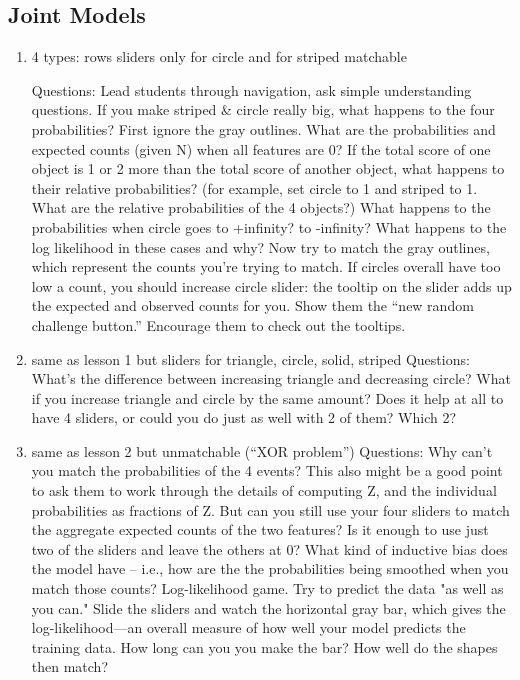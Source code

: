 \documentclass[11pt,letterpaper]{article}
\begin{document}
\subsection{Joint Models} \label{sec:jointlessons}
\begin{enumerate}
\item 
4 types: rows %
sliders only for circle and for striped
matchable

Questions: Lead students through navigation, ask simple understanding questions. If you make striped \& circle really big, what happens to the four probabilities?  First ignore the gray outlines.  What are the probabilities and expected counts (given N) when all features are 0?  If the total score of one object is 1 or 2 more than the total score of another object, what happens to their relative probabilities?  (for example, set circle to 1 and striped to 1.  What are the relative probabilities of the 4 objects?)  What happens to the probabilities when circle goes to +infinity?  to -infinity?  What happens to the log likelihood in these cases and why?  Now try to match the gray outlines, which represent the counts you’re trying to match.  If circles overall have too low a count, you should increase circle slider: the tooltip on the slider adds up the expected and observed counts for you.  Show them the “new random challenge button.”  Encourage them to check out the tooltips.
\item same as lesson 1 but sliders for triangle, circle, solid, striped
Questions: What’s the difference between increasing triangle and decreasing circle?  What if you increase triangle and circle by the same amount?  Does it help at all to have 4 sliders, or could you do just as well with 2 of them? Which 2?
\item same as lesson 2 but unmatchable (“XOR problem”)
Questions: Why can’t you match the probabilities of the 4 events? This also might be a good point to ask them to work through the details of computing Z, and the individual probabilities as fractions of Z. But can you still use your four sliders to match the aggregate expected counts of the two features?  Is it enough to use just two of the sliders and leave the others at 0?  What kind of inductive bias does the model have -- i.e., how are the the probabilities being smoothed when you match those counts?    
Log-likelihood game. Try to predict the data "as well as you can." Slide the sliders and watch the horizontal gray bar, which gives the log-likelihood—an overall measure of how well your model predicts the training data. How long can you you make the bar? How well do the shapes then match?


\end{enumerate}
\end{document}
